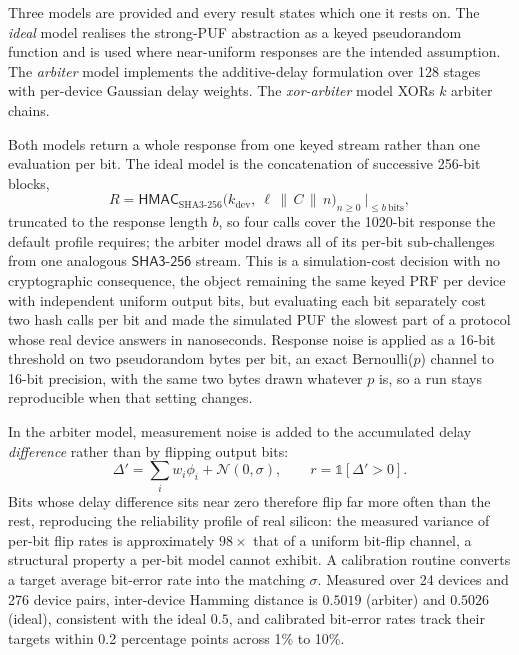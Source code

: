 \documentclass[journal]{IEEEtran}
\begin{document}
Three models are provided and every result states which one it rests on. The
\emph{ideal} model realises the strong-PUF abstraction as a keyed pseudorandom
function and is used where near-uniform responses are the intended assumption.
The \emph{arbiter} model implements the additive-delay formulation over 128
stages with per-device Gaussian delay weights. The \emph{xor-arbiter} model
XORs $k$ arbiter chains.

Both models return a whole response from one keyed stream rather than one
evaluation per bit. The ideal model is the concatenation of successive 256-bit
blocks,
\begin{equation}
R = \mathsf{HMAC}_{\text{SHA3-256}}\big(k_{\text{dev}},\ \ell \,\|\, C \,\|\, n\big)_{n \ge 0}
    \ \big|_{\le b\ \text{bits}},
\end{equation}
truncated to the response length $b$, so four calls cover the 1020-bit response
the default profile requires; the arbiter model draws all of its per-bit
sub-challenges from one analogous $\mathsf{SHA3\text{-}256}$ stream. This is a
simulation-cost decision with no cryptographic consequence, the object remaining
the same keyed PRF per device with independent uniform output bits, but
evaluating each bit separately cost two hash calls per bit and made the
simulated PUF the slowest part of a protocol whose real device answers in
nanoseconds. Response noise is applied as a 16-bit threshold on two
pseudorandom bytes per bit, an exact Bernoulli($p$) channel to 16-bit precision,
with the same two bytes drawn whatever $p$ is, so a run stays reproducible when
that setting changes.

In the arbiter model, measurement noise is added to the
accumulated delay \emph{difference} rather than by flipping output bits:
\begin{equation}
\Delta' = \textstyle\sum_{i} w_i \phi_i + \mathcal{N}(0,\sigma), \qquad
r = \mathbb{1}[\Delta' > 0].
\end{equation}
Bits whose delay difference sits near zero therefore flip far more often than
the rest, reproducing the reliability profile of real silicon: the measured
variance of per-bit flip rates is approximately $98\times$ that of a uniform
bit-flip channel, a structural property a per-bit model cannot exhibit. A
calibration routine converts a target average bit-error rate into the matching
$\sigma$. Measured over 24 devices and 276 device pairs, inter-device Hamming
distance is $0.5019$ (arbiter) and $0.5026$ (ideal), consistent with the ideal
$0.5$, and calibrated bit-error rates track their targets within 0.2 percentage
points across 1\% to 10\%.
\end{document}
